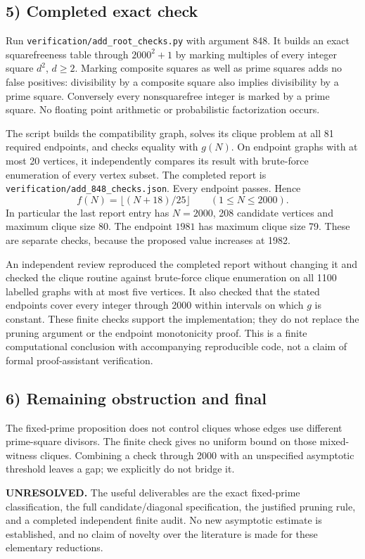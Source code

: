\subsection*{5) Completed exact check}
Run \texttt{verification/add\_root\_checks.py} with argument 848. It builds an exact squarefreeness table through $2000^2+1$ by marking multiples of every integer square $d^2$, $d\geq2$. Marking composite squares as well as prime squares adds no false positives: divisibility by a composite square also implies divisibility by a prime square. Conversely every nonsquarefree integer is marked by a prime square. No floating point arithmetic or probabilistic factorization occurs.

The script builds the compatibility graph, solves its clique problem at all 81 required endpoints, and checks equality with $g(N)$. On endpoint graphs with at most 20 vertices, it independently compares its result with brute-force enumeration of every vertex subset. The completed report is \texttt{verification/add\_848\_checks.json}. Every endpoint passes. Hence
\[
f(N)=\lfloor(N+18)/25\rfloor\qquad(1\leq N\leq2000).
\]
In particular the last report entry has $N=2000$, 208 candidate vertices and maximum clique size 80. The endpoint $1981$ has maximum clique size 79. These are separate checks, because the proposed value increases at 1982.

An independent review reproduced the completed report without changing it and checked the clique routine against brute-force clique enumeration on all 1100 labelled graphs with at most five vertices. It also checked that the stated endpoints cover every integer through 2000 within intervals on which $g$ is constant. These finite checks support the implementation; they do not replace the pruning argument or the endpoint monotonicity proof. This is a finite computational conclusion with accompanying reproducible code, not a claim of formal proof-assistant verification.

\subsection*{6) Remaining obstruction and final}
The fixed-prime proposition does not control cliques whose edges use different prime-square divisors. The finite check gives no uniform bound on those mixed-witness cliques. Combining a check through 2000 with an unspecified asymptotic threshold leaves a gap; we explicitly do not bridge it.

\textbf{UNRESOLVED.} The useful deliverables are the exact fixed-prime classification, the full candidate/diagonal specification, the justified pruning rule, and a completed independent finite audit. No new asymptotic estimate is established, and no claim of novelty over the literature is made for these elementary reductions.


